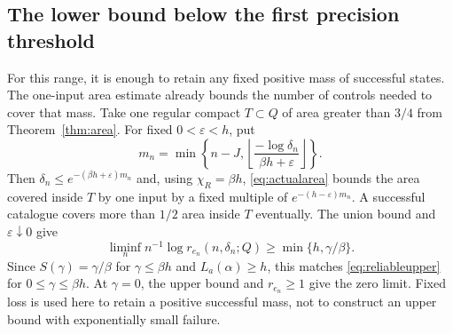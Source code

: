 \documentclass[11pt]{amsart}
\theoremstyle{definition}
\theoremstyle{remark}
\numberwithin{equation}{section}
\begin{document}
\subsection{The lower bound below the first precision threshold}
For this range, it is enough to retain any fixed positive mass of
successful states. The one-input area estimate already bounds the
number of controls needed to cover that mass.
Take one regular compact $T\subset Q$ of area greater than $3/4$
from Theorem~\ref{thm:area}. For fixed $0<\varepsilon<h$, put
\[
m_n=\min\left\{n-J,
\left\lfloor\frac{-\log\delta_n}{\beta h+\varepsilon}\right\rfloor\right\}.
\]
Then $\delta_n\le e^{-(\beta h+\varepsilon)m_n}$ and, using
$\chi_R=\beta h$, \eqref{eq:actualarea} bounds the area covered
inside $T$ by one input by a fixed multiple of
$e^{-(h-\varepsilon)m_n}$.
A successful catalogue covers more than $1/2$ area inside $T$
eventually. The union bound and $\varepsilon\downarrow0$ give
\begin{equation}\label{eq:reliablefixedmass}
\liminf_n n^{-1}\log r_{e_n}(n,\delta_n;Q)
                        \ge\min\{h,\gamma/\beta\}.
\end{equation}
Since $S(\gamma)=\gamma/\beta$ for $\gamma\le\beta h$
and $L_a(\alpha)\ge h$, this matches \eqref{eq:reliableupper}
for $0\le\gamma\le\beta h$. At $\gamma=0$, the upper bound and
$r_{e_n}\ge1$ give the zero limit. Fixed loss is used here to
retain a positive successful mass, not to construct an upper
bound with exponentially small failure.
\end{document}
